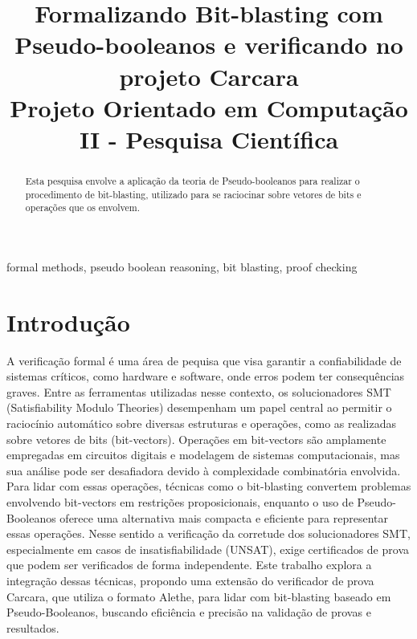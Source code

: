 \documentclass[conference]{IEEEtran}
\begin{document}
\title{Formalizando Bit-blasting com Pseudo-booleanos e verificando no projeto Carcara\\
{\footnotesize Projeto Orientado em Computação II - Pesquisa Científica}
}

\author{
}

\maketitle

\begin{abstract}
    Esta pesquisa envolve a aplicação da teoria de Pseudo-booleanos para realizar o procedimento de
    bit-blasting, utilizado para se raciocinar sobre vetores de bits e operações que os envolvem.
\end{abstract}

\begin{IEEEkeywords}
    formal methods, pseudo boolean reasoning, bit blasting, proof checking
\end{IEEEkeywords}

\section{Introdução}
A verificação formal é uma área de pequisa que visa garantir a confiabilidade de sistemas críticos,
como hardware e software, onde erros podem ter consequências graves. Entre as ferramentas utilizadas
nesse contexto, os solucionadores SMT (Satisfiability Modulo Theories) desempenham um papel central
ao permitir o raciocínio automático sobre diversas estruturas e operações, como as realizadas sobre
vetores de bits (bit-vectors). Operações em bit-vectors são amplamente empregadas em circuitos
digitais e modelagem de sistemas computacionais, mas sua análise pode ser desafiadora devido à
complexidade combinatória envolvida.
Para lidar com essas operações, técnicas como o bit-blasting convertem problemas envolvendo
bit-vectors em restrições proposicionais, enquanto o uso de Pseudo-Booleanos oferece uma alternativa
mais compacta e eficiente para representar essas operações. Nesse sentido a verificação da corretude
dos solucionadores SMT, especialmente em casos de insatisfiabilidade (UNSAT), exige certificados de
prova que podem ser verificados de forma independente. Este trabalho explora a integração dessas
técnicas, propondo uma extensão do verificador de prova Carcara, que utiliza o formato Alethe,
para lidar com bit-blasting baseado em Pseudo-Booleanos, buscando eficiência e precisão na
validação de provas e resultados.
\end{document}
